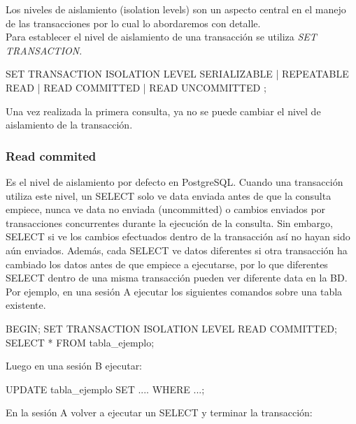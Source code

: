 Los niveles de aislamiento (isolation levels) son un aspecto central en el manejo de las transacciones por lo cual lo abordaremos con detalle.\\

Para establecer el nivel de aislamiento de una transacción se utiliza \textit{SET TRANSACTION}.\\

\begin{pyglist}
SET TRANSACTION ISOLATION LEVEL { SERIALIZABLE | REPEATABLE READ 
                            | READ COMMITTED | READ UNCOMMITTED };
\end{pyglist}

Una vez realizada la primera consulta, ya no se puede cambiar el nivel de aislamiento de la transacción.

\subsubsection{Read commited}

Es el nivel de aislamiento por defecto en PostgreSQL. Cuando una transacción utiliza este nivel, un SELECT solo ve data enviada antes de que la consulta empiece, nunca ve data no enviada (uncommitted) o cambios enviados por transacciones concurrentes durante la ejecución de la consulta. Sin embargo, SELECT si ve los cambios efectuados dentro de la transacción así no hayan sido aún enviados. Además, cada SELECT ve datos diferentes si otra transacción ha cambiado los datos antes de que empiece a ejecutarse, por lo que diferentes SELECT dentro de una misma transacción pueden ver diferente data en la BD. \\

Por ejemplo, en una sesión A ejecutar los siguientes comandos sobre una tabla existente.\\

\begin{pyglist}
BEGIN;
SET TRANSACTION ISOLATION LEVEL READ COMMITTED;
SELECT * FROM tabla_ejemplo;
\end{pyglist}

Luego en una sesión B ejecutar:\\

\begin{pyglist}
UPDATE tabla_ejemplo SET .... WHERE ...;
\end{pyglist}

En la sesión A volver a ejecutar un SELECT y terminar la transacción:\\


